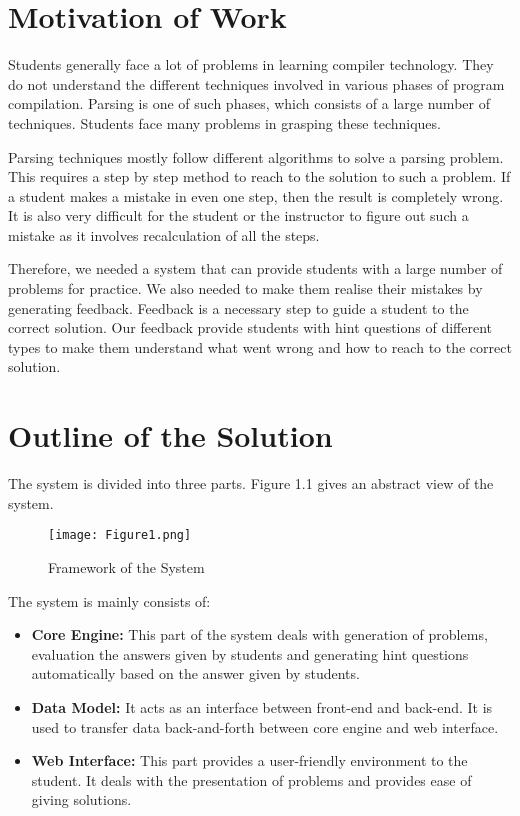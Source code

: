 \section{Motivation of Work}
\label{motivation}
Students generally face a lot of problems in learning compiler technology. They do not understand the different techniques involved in various phases of program compilation. Parsing is one of such phases, which consists of a large number of techniques. Students face many problems in grasping these techniques.

Parsing techniques mostly follow different algorithms to solve a parsing problem. This requires a step by step method to reach to the solution to such a problem. If a student makes a mistake in even one step, then the result is completely wrong. It is also very difficult for the student or the instructor to figure out such a mistake as it involves recalculation of all the steps.

Therefore, we needed a system that can provide students with a large number of problems for practice. We also needed to make them realise their mistakes by generating feedback. Feedback is a necessary step to guide a student to the correct solution. Our feedback provide students with hint questions of different types to make them understand what went wrong and how to reach to the correct solution.

\section{Outline of the Solution}
\label{outline}
The system is divided into three parts. Figure 1.1 gives an abstract view of the system.
\begin{figure}[h]
\centering
\texttt{[image: Figure1.png]}
\caption{Framework of the System}
\label{fig:framework}
\end{figure}

The system is mainly consists of:
\begin{itemize}
\item \textbf{Core Engine:} This part of the system deals with generation of problems, evaluation the answers given by students and generating hint questions automatically based on the answer given by students.
\item \textbf{Data Model:} It acts as an interface between front-end and back-end. It is used to transfer data back-and-forth between core engine and web interface.
\item \textbf{Web Interface:} This part provides a user-friendly environment to the student. It deals with the presentation of problems and provides ease of giving solutions.
\end{itemize}

